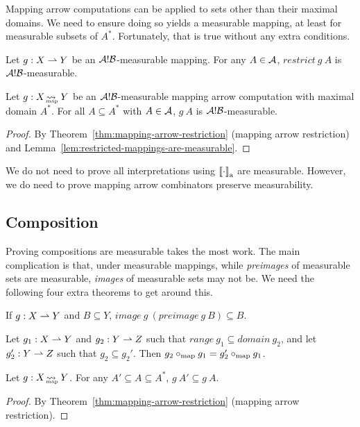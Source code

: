 Mapping arrow computations can be applied to sets other than their maximal domains.
We need to ensure doing so yields a measurable mapping, at least for measurable subsets of $A^*$.
Fortunately, that is true without any extra conditions.

\begin{lemma}
\label{lem:restricted-mappings-are-measurable}
Let $g : X \rightharpoonup Y$ be an $\mathcal{A}!\mathcal{B}$-measurable mapping.
For any $A \in \mathcal{A}$, $restrict~g~A$ is $\mathcal{A}!\mathcal{B}$-measurable.%
\end{lemma}

\begin{theorem}
\label{thm:restricted-computations-are-measurable}
Let $g : X \operatorname{\rightsquigarrow_{\mspace{-23mu}_\mathrm{map}}} Y$ be an $\mathcal{A}!\mathcal{B}$-measurable mapping arrow computation with maximal domain $A^*$.
For all $A \subseteq A^*$ with $A \in \mathcal{A}$, $g~A$ is $\mathcal{A}!\mathcal{B}$-measurable.
\end{theorem}
\begin{proof}
By Theorem~\ref{thm:mapping-arrow-restriction} (mapping arrow restriction) and Lemma~\ref{lem:restricted-mappings-are-measurable}.
\end{proof}

We do not need to prove all interpretations using $\left\llbracket{\cdot}\right\rrbracket_\mathrm{a}$ are measurable.
However, we do need to prove mapping arrow combinators preserve measurability.

\subsection{Composition}
Proving compositions are measurable takes the most work.
The main complication is that, under measurable mappings, while \emph{preimages} of measurable sets are measurable, \emph{images} of measurable sets may not be.
We need the following four extra theorems to get around this.

\begin{lemma}
\label{lem:images-of-preimages}
If $g : X \rightharpoonup Y$ and $B \subseteq Y$, $image~g~(preimage~g~B) \subseteq B$.%
\end{lemma}

\begin{lemma}
\label{lem:composition-expansion}
Let $g_1 : X \rightharpoonup Y$ and $g_2 : Y \rightharpoonup Z$ such that $range~g_1 \subseteq domain~g_2$, and let $g_2' : Y \rightharpoonup Z$ such that $g_2 \subseteq g_2'$.
Then $g_2 \circ_\mathrm{map} g_1 = g_2' \circ_\mathrm{map} g_1$.%
\end{lemma}

\begin{theorem}
\label{thm:mapping-arrow-monotonicity}
Let $g : X \operatorname{\rightsquigarrow_{\mspace{-23mu}_\mathrm{map}}} Y$.
For any $A' \subseteq A \subseteq A^*$, $g~A' \subseteq g~A$.%
\end{theorem}
\begin{proof}
By Theorem~\ref{thm:mapping-arrow-restriction} (mapping arrow restriction).
\end{proof}

